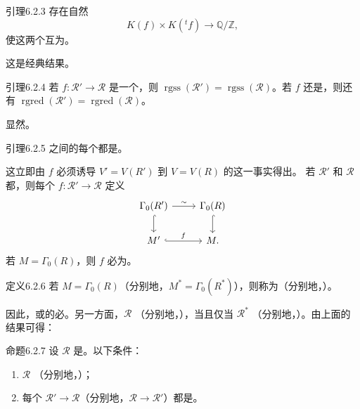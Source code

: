 \begin{SGAresult}{引理}{6.2.3}
存在自然
\[K(f)\times K({}^tf)\longrightarrow\mathbb Q/\mathbb Z,\]
使这两个互为。
\end{SGAresult}
这是经典结果。
\begin{SGAresult}{引理}{6.2.4}
若 $f:\mathscr R'\to\mathscr R$ 是一个，则 $\operatorname{rgss}(\mathscr R')=\operatorname{rgss}(\mathscr R)$。若 $f$ 还是，则还有 $\operatorname{rgred}(\mathscr R')=\operatorname{rgred}(\mathscr R)$。
\end{SGAresult}
显然。
\begin{SGAresult}{引理}{6.2.5}
之间的每个都是。
\end{SGAresult}
这立即由 $f$ 必须诱导 $V'=V(R')$ 到 $V=V(R)$ 的这一事实得出。
若 $\mathscr R'$ 和 $\mathscr R$ 都，则每个 $f:\mathscr R'\to\mathscr R$ 定义
\[\begin{tikzcd}
\Gamma_0(R')\arrow[r,"\sim"]\arrow[d,hook]&\Gamma_0(R)\arrow[d,hook]\\
M'\arrow[r,hook,"f"]&M.
\end{tikzcd}\]
若 $M=\Gamma_0(R)$，则 $f$ 必为。
\begin{SGAresult}{定义}{6.2.6}
若 $M=\Gamma_0(R)$（分别地，$M^*=\Gamma_0(R^*)$），则称为（分别地，）。
\end{SGAresult}
因此，或的必。另一方面，$\mathscr R$ （分别地，），当且仅当 $\mathscr R^*$ （分别地，）。由上面的结果可得：
\begin{SGAresult}{命题}{6.2.7}
设 $\mathscr R$ 是。以下条件：
\begin{enumerate}
\item[(i)] $\mathscr R$ （分别地，）；
\item[(ii)] 每个 $\mathscr R'\to\mathscr R$（分别地，$\mathscr R\to\mathscr R'$）都是。
\end{enumerate}
\end{SGAresult}
